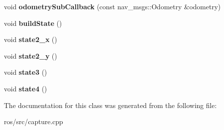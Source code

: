 \begin{DoxyCompactItemize}
\item 
\hypertarget{classCapture_a0e728ed9c7f8b9a5add44be7191a73df}{
void {\bfseries odometrySubCallback} (const nav\_\-msgs::Odometry \&odometry)}
\label{classCapture_a0e728ed9c7f8b9a5add44be7191a73df}

\item 
\hypertarget{classCapture_a2dd5dd745a113ac4184f605602fa7ffe}{
void {\bfseries buildState} ()}
\label{classCapture_a2dd5dd745a113ac4184f605602fa7ffe}

\item 
\hypertarget{classCapture_af279ebe75965759b219468b860a986c6}{
void {\bfseries state2\_\-x} ()}
\label{classCapture_af279ebe75965759b219468b860a986c6}

\item 
\hypertarget{classCapture_abc4f7864e73953aa9d608848b0bab217}{
void {\bfseries state2\_\-y} ()}
\label{classCapture_abc4f7864e73953aa9d608848b0bab217}

\item 
\hypertarget{classCapture_a66652781d84e73abc9d1ac2a0185c4ad}{
void {\bfseries state3} ()}
\label{classCapture_a66652781d84e73abc9d1ac2a0185c4ad}

\item 
\hypertarget{classCapture_afba8cb0c7d1f2355e5311ff765ac2e2c}{
void {\bfseries state4} ()}
\label{classCapture_afba8cb0c7d1f2355e5311ff765ac2e2c}

\end{DoxyCompactItemize}


The documentation for this class was generated from the following file:\begin{DoxyCompactItemize}
\item 
ros/src/capture.cpp\end{DoxyCompactItemize}
